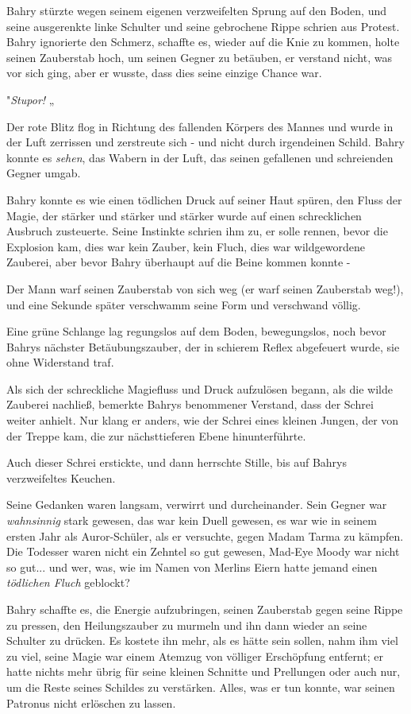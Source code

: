 {Bahry stürzte wegen seinem eigenen verzweifelten Sprung auf den Boden, und seine ausgerenkte linke Schulter und seine gebrochene Rippe schrien aus Protest. Bahry ignorierte den Schmerz, schaffte es, wieder auf die Knie zu kommen, holte seinen Zauberstab hoch, um seinen Gegner zu betäuben, er verstand nicht, was vor sich ging, aber er wusste, dass dies seine einzige Chance war.

"\emph{Stupor!} „

Der rote Blitz flog in Richtung des fallenden Körpers des Mannes und wurde in der Luft zerrissen und zerstreute sich - und nicht durch irgendeinen Schild. Bahry konnte es \emph{sehen}, das Wabern in der Luft, das seinen gefallenen und schreienden Gegner umgab.

Bahry konnte es wie einen tödlichen Druck auf seiner Haut spüren, den Fluss der Magie, der stärker und stärker und stärker wurde auf einen schrecklichen Ausbruch zusteuerte. Seine Instinkte schrien ihm zu, er solle rennen, bevor die Explosion kam, dies war kein Zauber, kein Fluch, dies war wildgewordene Zauberei, aber bevor Bahry überhaupt auf die Beine kommen konnte -

Der Mann warf seinen Zauberstab von sich weg (er warf seinen Zauberstab weg!), und eine Sekunde später verschwamm seine Form und verschwand völlig.

Eine grüne Schlange lag regungslos auf dem Boden, bewegungslos, noch bevor Bahrys nächster Betäubungszauber, der in schierem Reflex abgefeuert wurde, sie ohne Widerstand traf.

Als sich der schreckliche Magiefluss und Druck aufzulösen begann, als die wilde Zauberei nachließ, bemerkte Bahrys benommener Verstand, dass der Schrei weiter anhielt. Nur klang er anders, wie der Schrei eines kleinen Jungen, der von der Treppe kam, die zur nächsttieferen Ebene hinunterführte.

Auch dieser Schrei erstickte, und dann herrschte Stille, bis auf Bahrys verzweifeltes Keuchen.

Seine Gedanken waren langsam, verwirrt und durcheinander. Sein Gegner war \emph{wahnsinnig} stark gewesen, das war kein Duell gewesen, es war wie in seinem ersten Jahr als Auror-Schüler, als er versuchte, gegen Madam Tarma zu kämpfen. Die Todesser waren nicht ein Zehntel so gut gewesen, Mad-Eye Moody war nicht so gut... und wer, was, wie im Namen von Merlins Eiern hatte jemand einen \emph{tödlichen Fluch} geblockt?

Bahry schaffte es, die Energie aufzubringen, seinen Zauberstab gegen seine Rippe zu pressen, den Heilungszauber zu murmeln und ihn dann wieder an seine Schulter zu drücken. Es kostete ihn mehr, als es hätte sein sollen, nahm ihm viel zu viel, seine Magie war einem Atemzug von völliger Erschöpfung entfernt; er hatte nichts mehr übrig für seine kleinen Schnitte und Prellungen oder auch nur, um die Reste seines Schildes zu verstärken. Alles, was er tun konnte, war seinen Patronus nicht erlöschen zu lassen.

}
